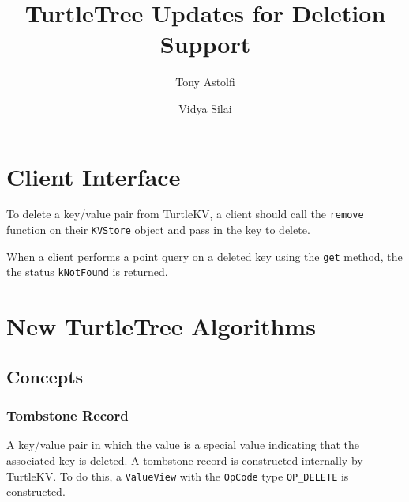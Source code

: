 \documentclass[11pt]{article}
\title{TurtleTree Updates for Deletion Support}
\author{
Tony Astolfi
\and
Vidya Silai
}
\begin{document}
\maketitle{}

\section{Client Interface}

To delete a key/value pair from TurtleKV, a client should call the \texttt{remove} function on their \texttt{KVStore} object and pass in the key to delete.

When a client performs a point query on a deleted key using the \texttt{get} method, the the status \texttt{kNotFound} is returned.

\section{New TurtleTree Algorithms}

\subsection{Concepts}

\subsubsection{Tombstone Record}

A key/value pair in which the value is a special value indicating that the associated key is deleted. A tombstone record is constructed
internally by TurtleKV. To do this, a \texttt{ValueView} with the \texttt{OpCode} type \texttt{OP\_DELETE} is constructed.
\end{document}
